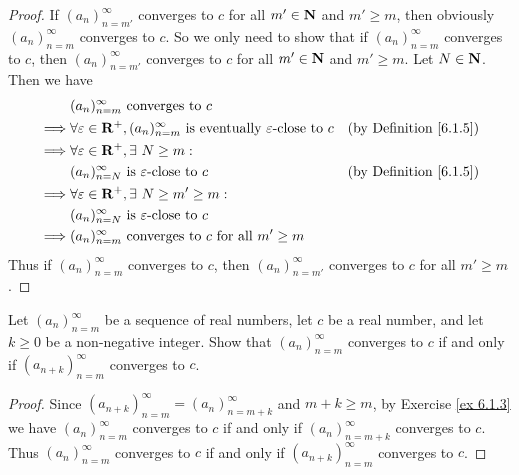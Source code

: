 \begin{proof}
    If \((a_n)_{n = m'}^\infty\) converges to \(c\) for all \(m' \in \mathbf{N}\) and \(m' \geq m\), then obviously \((a_n)_{n = m}^\infty\) converges to \(c\).
    So we only need to show that if \((a_n)_{n = m}^\infty\) converges to \(c\), then \((a_n)_{n = m'}^\infty\) converges to \(c\) for all \(m' \in \mathbf{N}\) and \(m' \geq m\).
    Let \(N \in \mathbf{N}\).
    Then we have
    \begin{align*}
                 & (a_n)_{n = m}^\infty \text{ converges to } c                                                                                                  \\
        \implies & \forall \varepsilon \in \mathbf{R}^+, (a_n)_{n = m}^\infty \text{ is eventually } \varepsilon\text{-close to } c & \text{(by Definition \ref{6.1.5})} \\
        \implies & \forall \varepsilon \in \mathbf{R}^+, \exists\ N \geq m :                                                                                             \\
                 & (a_n)_{n = N}^\infty \text{ is } \varepsilon\text{-close to } c                                          & \text{(by Definition \ref{6.1.5})} \\
        \implies & \forall \varepsilon \in \mathbf{R}^+, \exists\ N \geq m' \geq m :                                                                                     \\
                 & (a_n)_{n = N}^\infty \text{ is } \varepsilon\text{-close to } c                                                                               \\
        \implies & (a_n)_{n = m}^\infty \text{ converges to } c \text{ for all } m' \geq m
    \end{align*}
    Thus if \((a_n)_{n = m}^\infty\) converges to \(c\), then \((a_n)_{n = m'}^\infty\) converges to \(c\) for all \(m' \geq m\).
\end{proof}

\begin{exercise}\label{ex 6.1.4}
    Let \((a_n)_{n = m}^\infty\) be a sequence of real numbers, let \(c\) be a real number, and let \(k \geq 0\) be a non-negative integer.
    Show that \((a_n)_{n = m}^\infty\) converges to \(c\) if and only if \((a_{n + k})_{n = m}^\infty\) converges to \(c\).
\end{exercise}

\begin{proof}
    Since \((a_{n + k})_{n = m}^\infty = (a_n)_{n = m + k}^\infty\) and \(m + k \geq m\), by Exercise \ref{ex 6.1.3} we have \((a_n)_{n = m}^\infty\) converges to \(c\) if and only if \((a_n)_{n = m + k}^\infty\) converges to \(c\).
    Thus \((a_n)_{n = m}^\infty\) converges to \(c\) if and only if \((a_{n + k})_{n = m}^\infty\) converges to \(c\).
\end{proof}

